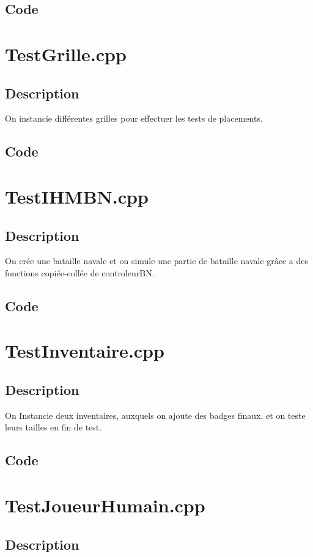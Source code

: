         \subsection{Code}
    \section{TestGrille.cpp}
        \subsection{Description}
            On instancie différentes grilles pour effectuer les tests de placements.
        \subsection{Code}
    \section{TestIHMBN.cpp}
        \subsection{Description}
            On crée une bataille navale et on simule une partie de bataille navale grâce a des fonctions copiée-collée de controleurBN.
        \subsection{Code}
    \section{TestInventaire.cpp}
        \subsection{Description}
            On Instancie deux inventaires, auxquels on ajoute des badges finaux, et on teste leurs tailles en fin de test.
        \subsection{Code}
    \section{TestJoueurHumain.cpp}
        \subsection{Description}
